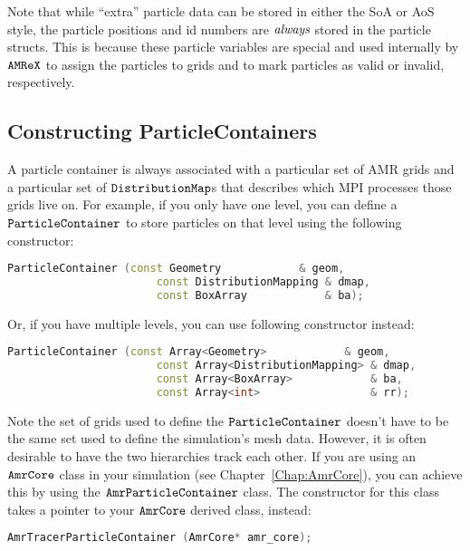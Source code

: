 Note that while ``extra'' particle data can be stored in either the SoA or AoS style, the particle positions and id numbers are $\emph{always}$ stored in the particle
structs. This is because these particle variables are special and used internally by $\tt{AMReX}$ to assign the particles to grids and to mark particles as valid or invalid, respectively.

\subsection{Constructing ParticleContainers}

A particle container is always associated with a particular set of AMR grids and a particular set of $\tt{DistributionMap}$s that describes which MPI processes those grids live on.
For example, if you only have one level, you can define a $\tt{ParticleContainer}$ to store particles on that level using the following constructor:

\begin{lstlisting}[language=cpp]
    ParticleContainer (const Geometry            & geom,
                       const DistributionMapping & dmap,
                       const BoxArray            & ba);
\end{lstlisting}

Or, if you have multiple levels, you can use following constructor instead:

\begin{lstlisting}[language=cpp]
    ParticleContainer (const Array<Geometry>            & geom,
                       const Array<DistributionMapping> & dmap,
                       const Array<BoxArray>            & ba,
                       const Array<int>                 & rr);
\end{lstlisting}

Note the set of grids used to define the $\tt{ParticleContainer}$ doesn't have to be the same set used to define the simulation's mesh data. However, it is often desirable to have
the two hierarchies track each other. If you are using an $\tt{AmrCore}$ class in your simulation (see Chapter~\ref{Chap:AmrCore}), you can achieve this by using 
the $\tt{AmrParticleContainer}$ class. The constructor for this class takes a pointer to your $\tt{AmrCore}$ derived class, instead:

\begin{lstlisting}[language=cpp]
  AmrTracerParticleContainer (AmrCore* amr_core);
\end{lstlisting}

